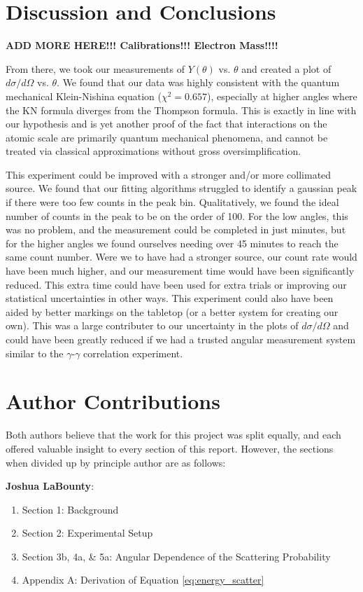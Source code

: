 \documentclass[%
 reprint,
 amsmath,amssymb,
 aps,
 pra,
]{revtex4-1}
\begin{document}
\section{Discussion and Conclusions}
\textbf{ADD MORE HERE!!! Calibrations!!! Electron Mass!!!!}

From there, we took our measurements of $Y(\theta)$ vs. $\theta$ and created a plot of $d\sigma / d\Omega$ vs. $\theta$. We found that our data was highly consistent with the quantum mechanical Klein-Nishina equation ($\chi^2 = 0.657$), especially at higher angles where the KN formula diverges from the Thompson formula. This is exactly in line with our hypothesis and is yet another proof of the fact that interactions on the atomic scale are primarily quantum mechanical phenomena, and cannot be treated via classical approximations without gross oversimplification.

This experiment could be improved with a stronger and/or more collimated source. We found that our fitting algorithms struggled to identify a gaussian peak if there were too few counts in the peak bin. Qualitatively, we found the ideal number of counts in the peak to be on the order of 100. For the low angles, this was no problem, and the measurement could be completed in just minutes, but for the higher angles we found ourselves needing over 45 minutes to reach the same count number. Were we to have had a stronger source, our count rate would have been much higher, and our measurement time would have been significantly reduced. This extra time could have been used for extra trials or improving our statistical uncertainties in other ways. This experiment could also have been aided by better markings on the tabletop (or a better system for creating our own). This was a large contributer to our uncertainty in the plots of $d\sigma / d\Omega$ and could have been greatly reduced if we had a trusted angular measurement system similar to the $\gamma$-$\gamma$ correlation experiment.

\section{Author Contributions}

Both authors believe that the work for this project was split equally, and each offered valuable insight to every section of this report. However, the sections when divided up by principle author are as follows:

\noindent \textbf{Joshua LaBounty}:
\begin{enumerate}
	\item Section 1: Background 
	\item Section 2: Experimental Setup
	\item Section 3b, 4a, \& 5a: Angular Dependence of the Scattering Probability
	\item Appendix A: Derivation of Equation \ref{eq:energy_scatter}
\end{enumerate}
\end{document}
